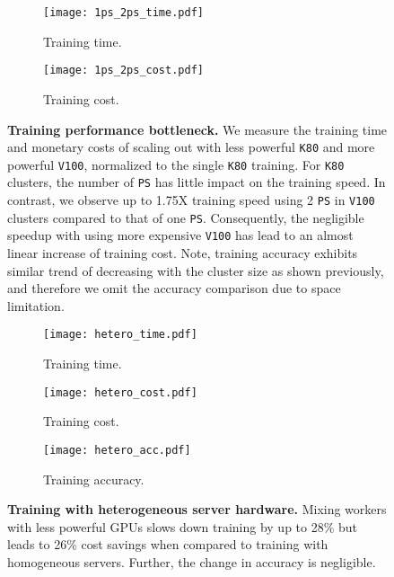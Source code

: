 \begin{figure}[t]
%
    \begin{subfigure}{0.23\textwidth}
    \centering
    \texttt{[image: 1ps\_2ps\_time.pdf]}
        \caption{Training time.}
    \label{subfig:1ps2ps_time} 
    \end{subfigure}
    \begin{subfigure}{0.23\textwidth}
    \centering
    \texttt{[image: 1ps\_2ps\_cost.pdf]}
        \caption{Training cost.}
    \label{subfig:1ps2ps_cost} 
    \end{subfigure}
    \caption{\textbf{Training performance bottleneck.} We measure the training time and monetary costs of scaling out with less powerful \texttt{K80} and more powerful \texttt{V100}, normalized to the single \texttt{K80} training. For \texttt{K80} clusters, the number of \texttt{PS} has little impact on the training speed. In contrast, we observe up to 1.75X training speed using 2 \texttt{PS} in \texttt{V100} clusters compared to that of one \texttt{PS}. Consequently, the negligible speedup with using more expensive \texttt{V100} has lead to an almost linear increase of training cost. Note, training accuracy exhibits similar trend of decreasing with the cluster size as shown previously, and therefore we omit the accuracy comparison due to space limitation.
    }
    \label{fig:1ps_2ps}
\end{figure}



\begin{figure*}[t]
%
    \begin{subfigure}{0.32\textwidth}
    \centering
    \texttt{[image: hetero\_time.pdf]}
        \caption{Training time.}
    \label{subfig:heter_time} 
    \end{subfigure}
\hfill
    \begin{subfigure}{0.32\textwidth}
    \centering
    \texttt{[image: hetero\_cost.pdf]}
        \caption{Training cost.}
    \label{subfig:heter_cost} 
    \end{subfigure}
   \hfill
    \begin{subfigure}{0.32\textwidth}
    \centering
    \texttt{[image: hetero\_acc.pdf]}
        \caption{Training accuracy.}
    \label{subfig:heter_acc} 
    \end{subfigure}
    \caption{\textbf{Training with heterogeneous server hardware.}
    Mixing workers with less powerful GPUs slows down training by up to 28\%
    but leads to 26\% cost savings when compared to training with homogeneous
    servers. Further, the change in accuracy is negligible. 
     }
    \label{fig:heter_train}
\end{figure*}


